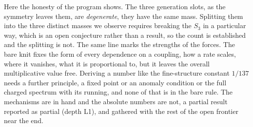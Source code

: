 Here the honesty of the program shows. The three generation slots, as the symmetry leaves them, are \emph{degenerate}, they have the same mass. Splitting them into the three distinct masses we observe requires breaking the $S_3$ in a particular way, which is an open conjecture rather than a result, so the count is established and the splitting is not. The same line marks the strengths of the forces. The bare knit fixes the form of every dependence on a coupling, how a rate scales, where it vanishes, what it is proportional to, but it leaves the overall multiplicative value free. Deriving a number like the fine-structure constant $1/137$ needs a further principle, a fixed point or an anomaly condition or the full charged spectrum with its running, and none of that is in the bare rule. The mechanisms are in hand and the absolute numbers are not, a partial result reported as partial (depth L1), and gathered with the rest of the open frontier near the end.
